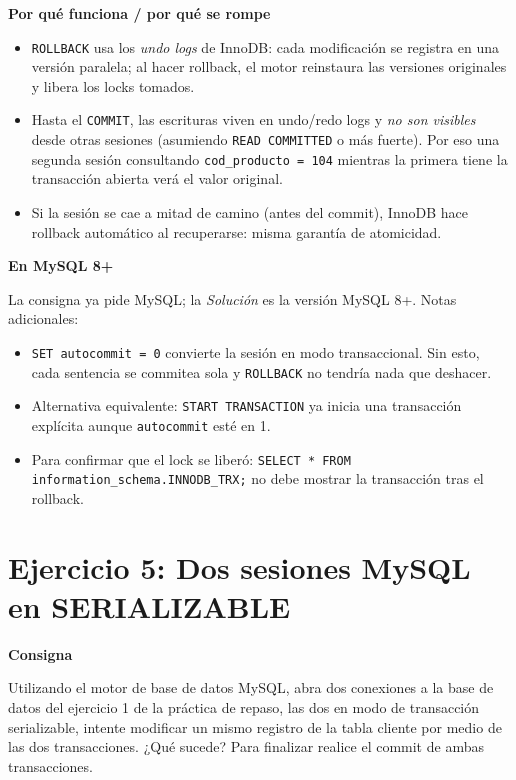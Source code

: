 \documentclass[11pt,a4paper]{article}
\newcommand{\itemcabecera}[1]{\noindent\textbf{#1}\par\medskip}
\newcommand{\bloqueConsigna}{\itemcabecera{Consigna}}
\newcommand{\bloquePorque}{\itemcabecera{Por qu\'e funciona / por qu\'e se rompe}}
\newcommand{\bloqueMySQL}{\itemcabecera{En MySQL 8+}}
\begin{document}
\bloquePorque

\begin{itemize}
    \item \texttt{ROLLBACK} usa los \emph{undo logs} de InnoDB: cada modificación se registra en una versión paralela; al hacer rollback, el motor reinstaura las versiones originales y libera los locks tomados.
    \item Hasta el \texttt{COMMIT}, las escrituras viven en undo/redo logs y \emph{no son visibles} desde otras sesiones (asumiendo \texttt{READ COMMITTED} o más fuerte). Por eso una segunda sesión consultando \texttt{cod\_producto = 104} mientras la primera tiene la transacción abierta verá el valor original.
    \item Si la sesión se cae a mitad de camino (antes del commit), InnoDB hace rollback automático al recuperarse: misma garantía de atomicidad.
\end{itemize}

\bloqueMySQL

La consigna ya pide MySQL; la \textit{Solución} es la versión MySQL 8+. Notas adicionales:

\begin{itemize}
    \item \texttt{SET autocommit = 0} convierte la sesión en modo transaccional. Sin esto, cada sentencia se commitea sola y \texttt{ROLLBACK} no tendría nada que deshacer.
    \item Alternativa equivalente: \texttt{START TRANSACTION} ya inicia una transacción explícita aunque \texttt{autocommit} esté en 1.
    \item Para confirmar que el lock se liberó: \texttt{SELECT * FROM information\_schema.INNODB\_TRX;} no debe mostrar la transacción tras el rollback.
\end{itemize}

\section{Ejercicio 5: Dos sesiones MySQL en SERIALIZABLE}

\bloqueConsigna

Utilizando el motor de base de datos MySQL, abra dos conexiones a la base de datos del ejercicio 1 de la práctica de repaso, las dos en modo de transacción serializable, intente modificar un mismo registro de la tabla cliente por medio de las dos transacciones. ¿Qué sucede? Para finalizar realice el commit de ambas transacciones.
\end{document}
